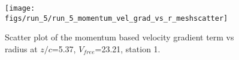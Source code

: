 \begin{figure}[H]
\centering
\texttt{[image: figs/run\_5/run\_5\_momentum\_vel\_grad\_vs\_r\_meshscatter]}
\caption{Scatter plot of the momentum based velocity gradient term vs radius at $z/c$=5.37, $V_{free}$=23.21, station 1.}
\label{fig:run_5_momentum_vel_grad_vs_r_meshscatter}
\end{figure}


